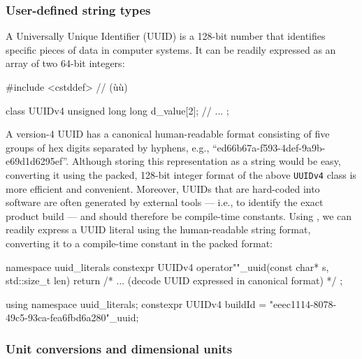 \subsubsection[User-defined string types]{User-defined string types}\label{user-defined-string-types}

A Universally Unique Identifier (UUID) is a 128-bit number that
identifies specific pieces of data in computer systems. It can be
readily expressed as an array of two 64-bit integers:

\begin{emcppshiddenlisting}[emcppsbatch=e18]
#include <cstddef>  // (ù{}ù)
\end{emcppshiddenlisting}
\begin{emcppslisting}[emcppsbatch=e18]
class UUIDv4
{
    unsigned long long d_value[2];
    // ...
};
\end{emcppslisting}
    
\noindent A version-4 UUID has a canonical human-readable format consisting of
five groups of hex digits separated by hyphens, e.g.,
``ed66b67a-f593-4def-9a9b-e69d1d6295ef''. Although storing this
representation as a string would be easy, converting it using the
packed, 128-bit integer format of the above \lstinline!UUIDv4! class is
more efficient and convenient. Moreover, UUIDs that are hard-coded into
software are often generated by external tools --- i.e., to identify the
exact product build --- and should therefore be compile-time constants.
Using , we can readily express a UUID literal using the
human-readable string format, converting it to a compile-time constant
in the packed format:

\begin{emcppslisting}[emcppsbatch=e18]
namespace uuid_literals
{
    constexpr UUIDv4 operator""_uuid(const char* s, std::size_t len)
    {
        return { /* ... (decode UUID expressed in canonical format) */ };
    }
}

using namespace uuid_literals;
constexpr UUIDv4 buildId = "eeec1114-8078-49c5-93ca-fea6fbd6a280"_uuid;
\end{emcppslisting}
    

\subsubsection[Unit conversions and dimensional units]{Unit conversions and dimensional units}\label{unit-conversions-and-dimensional-units}

